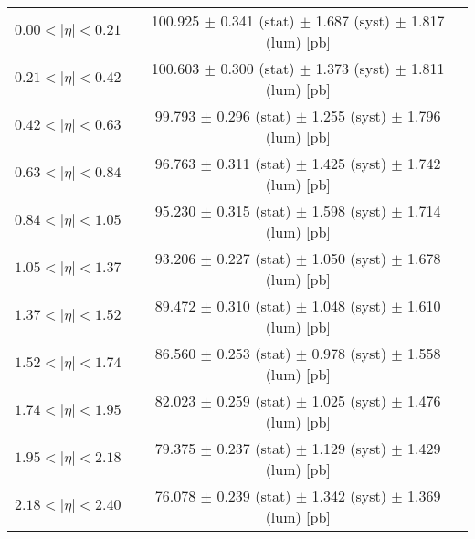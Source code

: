 \begin{tabular}{lc}
\hline
$0.00 < |\eta| <0.21$          & 100.925 $\pm$ 0.341 (stat) $\pm$ 1.687 (syst) $\pm$ 1.817 (lum) [pb]  \\
$0.21 < |\eta| <0.42$          & 100.603 $\pm$ 0.300 (stat) $\pm$ 1.373 (syst) $\pm$ 1.811 (lum) [pb]  \\
$0.42 < |\eta| <0.63$          & 99.793 $\pm$ 0.296 (stat) $\pm$ 1.255 (syst) $\pm$ 1.796 (lum) [pb]  \\
$0.63 < |\eta| <0.84$          & 96.763 $\pm$ 0.311 (stat) $\pm$ 1.425 (syst) $\pm$ 1.742 (lum) [pb]  \\
$0.84 < |\eta| <1.05$          & 95.230 $\pm$ 0.315 (stat) $\pm$ 1.598 (syst) $\pm$ 1.714 (lum) [pb]  \\
$1.05 < |\eta| <1.37$          & 93.206 $\pm$ 0.227 (stat) $\pm$ 1.050 (syst) $\pm$ 1.678 (lum) [pb]  \\
$1.37 < |\eta| <1.52$          & 89.472 $\pm$ 0.310 (stat) $\pm$ 1.048 (syst) $\pm$ 1.610 (lum) [pb]  \\
$1.52 < |\eta| <1.74$          & 86.560 $\pm$ 0.253 (stat) $\pm$ 0.978 (syst) $\pm$ 1.558 (lum) [pb]  \\
$1.74 < |\eta| <1.95$          & 82.023 $\pm$ 0.259 (stat) $\pm$ 1.025 (syst) $\pm$ 1.476 (lum) [pb]  \\
$1.95 < |\eta| <2.18$          & 79.375 $\pm$ 0.237 (stat) $\pm$ 1.129 (syst) $\pm$ 1.429 (lum) [pb]  \\
$2.18 < |\eta| <2.40$          & 76.078 $\pm$ 0.239 (stat) $\pm$ 1.342 (syst) $\pm$ 1.369 (lum) [pb]  \\
\hline
\end{tabular}
